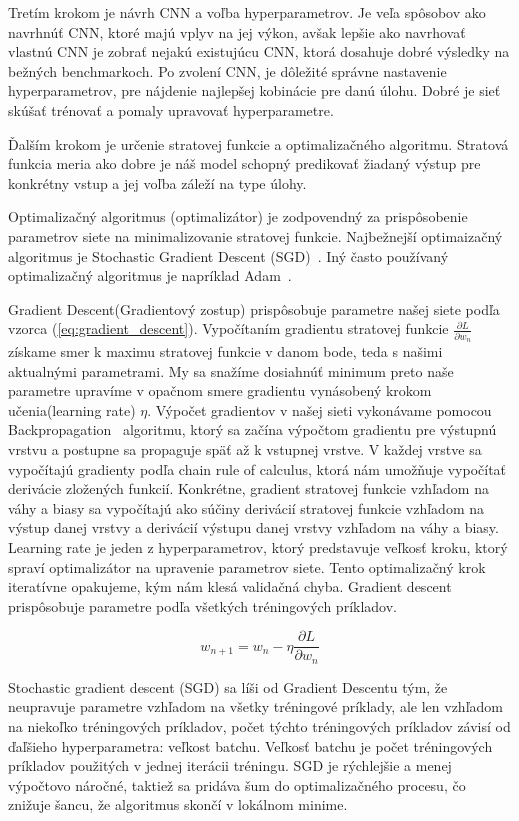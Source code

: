 Tretím krokom je návrh CNN a voľba hyperparametrov. Je veľa spôsobov ako navrhnúť CNN, ktoré majú vplyv na jej výkon, avšak lepšie ako navrhovať vlastnú CNN je zobrať nejakú existujúcu CNN, ktorá dosahuje dobré výsledky na bežných benchmarkoch. Po zvolení CNN, je dôležité správne nastavenie hyperparametrov, pre nájdenie najlepšej kobinácie pre danú úlohu. Dobré je sieť skúšať trénovať a pomaly upravovať hyperparametre.

Ďalším krokom je určenie stratovej funkcie a optimalizačného algoritmu. Stratová funkcia meria ako dobre je náš model schopný predikovať žiadaný výstup pre konkrétny vstup a jej voľba záleží na type úlohy. 

Optimalizačný algoritmus (optimalizátor) je zodpovendný za prispôsobenie parametrov siete na minimalizovanie stratovej funkcie. Najbežnejší optimaizačný algoritmus je Stochastic Gradient Descent (SGD)~\cite{sgd}. Iný často používaný optimalizačný algoritmus je napríklad Adam~\cite{Adam}. 

Gradient Descent(Gradientový zostup) prispôsobuje parametre našej siete podľa vzorca (\ref{eq:gradient_descent}). Vypočítaním gradientu stratovej funkcie $\frac{\partial L}{\partial w_n}$ získame smer k maximu stratovej funkcie v danom bode, teda s našimi aktualnými parametrami. My sa snažíme dosiahnúť minimum preto naše parametre upravíme v opačnom smere gradientu vynásobený krokom učenia(learning rate) $\eta$. Výpočet gradientov v našej sieti vykonávame pomocou Backpropagation~\cite{backprop} algoritmu, ktorý sa začína výpočtom gradientu pre výstupnú vrstvu a postupne sa propaguje späť až k vstupnej vrstve. V každej vrstve sa vypočítajú gradienty podľa chain rule of calculus, ktorá nám umožňuje vypočítať derivácie zložených funkcií. Konkrétne, gradient stratovej funkcie vzhľadom na váhy a biasy sa vypočítajú ako súčiny derivácií stratovej funkcie vzhľadom na výstup danej vrstvy a derivácií výstupu danej vrstvy vzhľadom na váhy a biasy. Learning rate je jeden z hyperparametrov, ktorý predstavuje veľkosť kroku, ktorý spraví optimalizátor na upravenie parametrov siete. Tento optimalizačný krok iteratívne opakujeme, kým nám klesá validačná chyba. Gradient descent prispôsobuje parametre podľa všetkých tréningových príkladov.

\begin{equation}
w_{n+1} = w_n - \eta \frac{\partial L}{\partial w_n} \label{eq:gradient_descent}
\end{equation}

Stochastic gradient descent (SGD) sa líši od Gradient Descentu tým, že neupravuje parametre vzhľadom na všetky tréningové príklady, ale len vzhľadom na niekoľko tréningových príkladov, počet týchto tréningových príkladov závisí od ďaľšieho hyperparametra: veľkost batchu. Veľkosť batchu je počet tréningových príkladov použitých v jednej iterácii tréningu. SGD je rýchlejšie a menej výpočtovo náročné, taktiež sa pridáva šum do optimalizačného procesu, čo znižuje šancu, že algoritmus skončí v lokálnom minime. 

